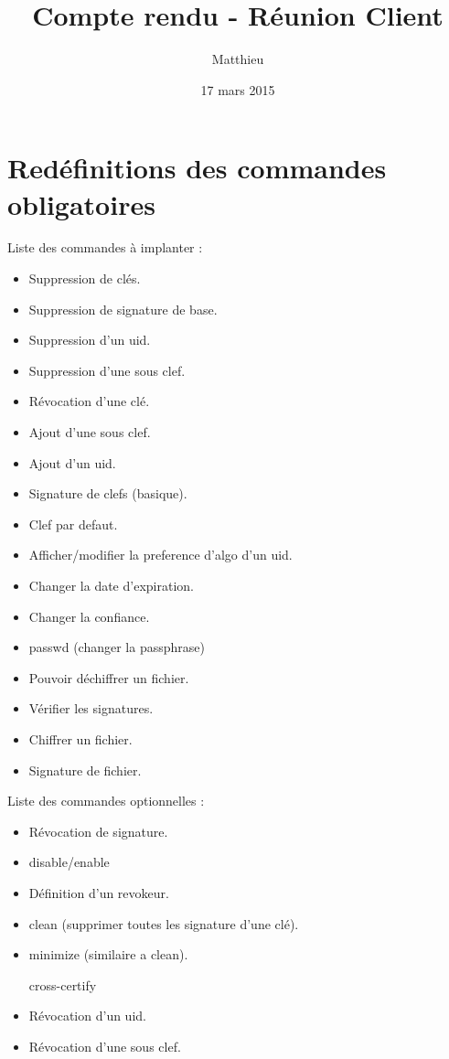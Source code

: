 \documentclass{CR-projet}
\title{Compte rendu - Réunion Client}
\author{Matthieu \bsc{FIN}}
\date{17 mars 2015}
\begin{document}
\maketitle
\newpage

\newpage

\section{Redéfinitions des commandes obligatoires}

Liste des commandes à implanter :
\begin{itemize}
	\item Suppression de clés.
	\item Suppression de signature de base. 
	\item Suppression d'un uid. 
	\item Suppression d'une sous clef. 
	\item Révocation d'une clé. 
	\item Ajout d'une sous clef.
	\item Ajout d'un uid.
	\item Signature de clefs (basique).
	\item Clef par defaut.
	\item Afficher/modifier la preference d'algo d'un uid.
	\item Changer la date d'expiration.
	\item Changer la confiance.
	\item passwd (changer la passphrase)
	\item Pouvoir déchiffrer un fichier.
	\item Vérifier les signatures.
	\item Chiffrer un fichier.
	\item Signature de fichier.
\end{itemize}
\vspace{1cm}
Liste des commandes optionnelles :
\begin{itemize}
	\item Révocation de signature.
	\item disable/enable
	\item Définition d'un revokeur.
	\item clean (supprimer toutes les signature d'une clé).
	\item minimize (similaire a clean).
	\item [cross-certify]
	\item Révocation d'un uid.
	\item Révocation d'une sous clef.
\end{itemize}
\end{document}
